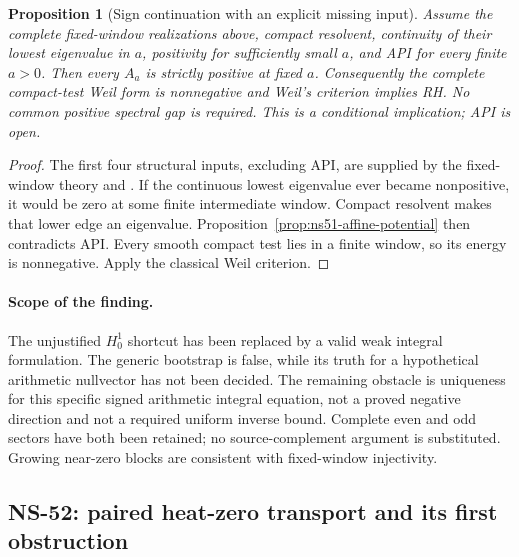 \documentclass[11pt]{article}
\newtheorem{proposition}[theorem]{Proposition}
\theoremstyle{remark}
\begin{document}
\begin{proposition}[Sign continuation with an explicit missing input]
\label{prop:ns51-sign-continuation}
Assume the complete fixed-window realizations above, compact resolvent,
continuity of their lowest eigenvalue in $a$, positivity for sufficiently
small $a$, and API for every finite $a>0$. Then every $A_a$ is strictly
positive at fixed $a$. Consequently the complete compact-test Weil
form is nonnegative and Weil's criterion implies RH. No common positive
spectral gap is required. This is a conditional implication; API is open.
\end{proposition}
\begin{proof}
The first four structural inputs, excluding API, are supplied by the
fixed-window theory and \cite[Theorems 1.3--1.4]{Suzuki2026}.
If the continuous lowest eigenvalue ever became nonpositive, it would
be zero at some finite intermediate window. Compact resolvent makes
that lower edge an eigenvalue. Proposition~\ref{prop:ns51-affine-potential}
then contradicts API. Every smooth compact test lies in a finite window,
so its energy is nonnegative. Apply the classical Weil criterion.
\end{proof}

\paragraph{Scope of the finding.}
The unjustified $H_0^1$ shortcut has been replaced by a valid weak
integral formulation. The generic bootstrap is false, while its truth
for a hypothetical arithmetic nullvector has not been decided. The
remaining obstacle is uniqueness for this specific signed arithmetic
integral equation, not a proved negative direction and not a required
uniform inverse bound. Complete even and odd sectors have both been
retained; no source-complement argument is substituted. Growing
near-zero blocks are consistent with fixed-window injectivity.


\subsection*{NS-52: paired heat-zero transport and its first obstruction}
\end{document}

